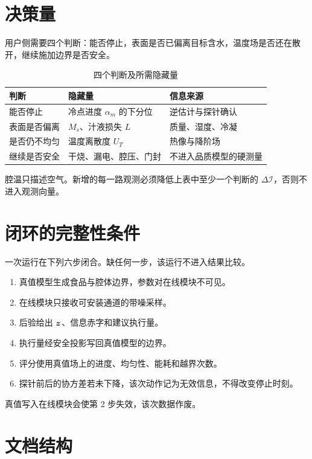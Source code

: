 \section{决策量}

用户侧需要四个判断：能否停止，表面是否已偏离目标含水，温度场是否还在散开，继续施加边界是否安全。

\begin{table}[H]
\centering
\caption{四个判断及所需隐藏量}
\begin{tabularx}{\textwidth}{lXX}
\toprule
判断 & 隐藏量 & 信息来源 \\
\midrule
能否停止 & 冷点进度 $\alpha_m$ 的下分位 & 逆估计与探针确认 \\
表面是否偏离 & $M_s$、汁液损失 $L$ & 质量、湿度、冷凝 \\
是否仍不均匀 & 温度离散度 $U_T$ & 热像与降阶场 \\
继续是否安全 & 干烧、漏电、腔压、门封 & 不进入品质模型的硬测量 \\
\bottomrule
\end{tabularx}
\end{table}

腔温只描述空气。新增的每一路观测必须降低上表中至少一个判断的 $\Delta\mathcal{I}$，否则不进入观测向量。

\section{闭环的完整性条件}

一次运行在下列六步闭合。缺任何一步，该运行不进入结果比较。

\begin{enumerate}
\item 真值模型生成食品与腔体边界，参数对在线模块不可见。
\item 在线模块只接收可安装通道的带噪采样。
\item 后验给出 $\bm{z}$、信息赤字和建议执行量。
\item 执行量经安全投影写回真值模型的边界。
\item 评分使用真值场上的进度、均匀性、能耗和越界次数。
\item 探针前后的协方差若未下降，该次动作记为无效信息，不得改变停止时刻。
\end{enumerate}

真值写入在线模块会使第 2 步失效，该次数据作废。

\section{文档结构}

